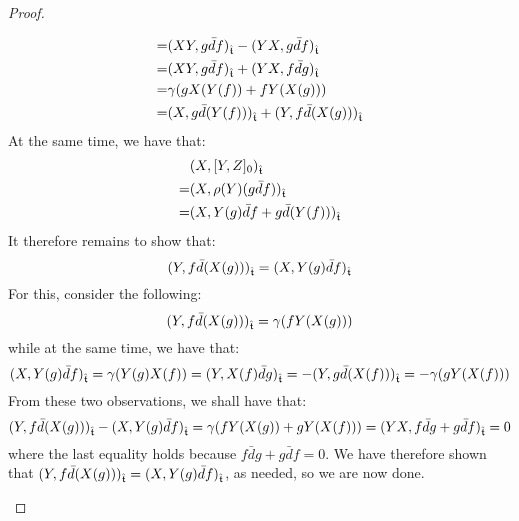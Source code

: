 \begin{proof}
\begin{enumerate}
$$\begin{aligned}
                                = & ( XY, g\bar{d}f )_{\hat{\mathfrak{t}}} - ( YX, g\bar{d}f )_{\hat{\mathfrak{t}}}
                                \\
                                = & ( XY, g\bar{d}f )_{\hat{\mathfrak{t}}} + ( YX, f\bar{d}g )_{\hat{\mathfrak{t}}}
                                \\
                                = & \gamma( g X(Y(f)) + f Y(X(g)) )
                                \\
                                = & ( X, g \bar{d}(Y(f)) )_{\hat{\mathfrak{t}}} + ( Y, f \bar{d}(X(g) ) )_{\hat{\mathfrak{t}}}
                            \end{aligned}
                        $$
                    At the same time, we have that:
                        $$
                            \begin{aligned}
                                & ( X, [Y, Z]_0 )_{\hat{\mathfrak{t}}}
                                \\
                                = & ( X, \rho(Y)(g \bar{d}f) )_{\hat{\mathfrak{t}}}
                                \\
                                = & ( X, Y(g) \bar{d}f + g \bar{d}(Y(f)) )_{\hat{\mathfrak{t}}}
                            \end{aligned}
                        $$
                    It therefore remains to show that:
                        $$( Y, f \bar{d}(X(g) ) )_{\hat{\mathfrak{t}}} = ( X, Y(g) \bar{d}f )_{\hat{\mathfrak{t}}}$$
                    For this, consider the following:
                        $$( Y, f \bar{d}(X(g) ) )_{\hat{\mathfrak{t}}} = \gamma( f Y(X(g)) )$$
                    while at the same time, we have that:
                        $$( X, Y(g) \bar{d}f )_{\hat{\mathfrak{t}}} = \gamma( Y(g) X(f) ) = ( Y, X(f) \bar{d}g )_{\hat{\mathfrak{t}}} = -(Y, g \bar{d}(X(f)) )_{\hat{\mathfrak{t}}} = -\gamma( g Y(X(f)) )$$
                    From these two observations, we shall have that:
                        $$( Y, f \bar{d}(X(g) ) )_{\hat{\mathfrak{t}}} - ( X, Y(g) \bar{d}f )_{\hat{\mathfrak{t}}} = \gamma( f Y(X(g)) + g Y(X(f)) ) = ( YX, f \bar{d}g + g \bar{d}f )_{\hat{\mathfrak{t}}} = 0$$
                    where the last equality holds because $f \bar{d}g + g \bar{d}f = 0$. We have therefore shown that $( Y, f \bar{d}(X(g) ) )_{\hat{\mathfrak{t}}} = ( X, Y(g) \bar{d}f )_{\hat{\mathfrak{t}}}$, as needed, so we are now done.
                \end{enumerate}
            \end{proof}
            
